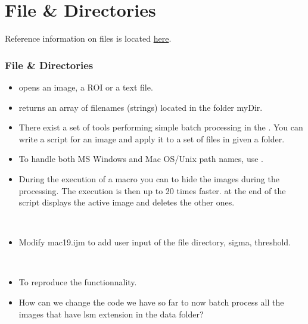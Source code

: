 \section{File \& Directories}
Reference information on files is located
\href{http://rsb.info.nih.gov/ij/developer/macro/functions.html#file}{here}.
\begin{frame}
  \frametitle<presentation>{File \& Directories}
  \begin{itemize}
  \item {} opens an image, a ROI or a text file.
  \item {} returns an array of
    filenames (strings) located in the folder myDir.
  \item There exist a set of tools performing
    simple batch processing in the . You can write a script for an image and apply it to a set of files in given a folder.
  \item To handle both MS Windows and Mac OS/Unix path names, use
    .
     \item During the execution of a macro you can  to hide the images during the processing. The execution is then up to
    20 times faster.  at the end of the script
    displays the active image and deletes the other ones.
  \end{itemize}
\end{frame}

\begin{frame}[fragile]
	\begin{example}~\par
		\begin{itemize}
			\item Modify mac19.ijm to add user input of the file directory, sigma, threshold.
		\end{itemize}
		
	\end{example}
\end{frame}

\begin{frame}
  \begin{example}~\par
    \begin{itemize}
    \item To reproduce the  functionnality.
      
     \item How can we change the code we have so far to now batch process all the images that have lsm extension in the data folder? 
    \end{itemize}
  \end{example}
\end{frame}

